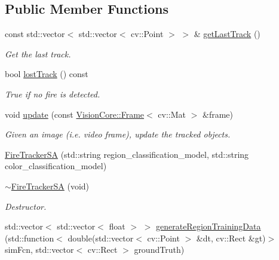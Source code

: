 \subsection*{Public Member Functions}
\begin{DoxyCompactItemize}
\item 
const std\+::vector$<$ std\+::vector$<$ cv\+::\+Point $>$ $>$ \& \hyperlink{class_fire_tracker_s_a_ae1ccd303e827f5d00620e54bb11a968c}{get\+Last\+Track} ()
\begin{DoxyCompactList}\small\item\em Get the last track. \end{DoxyCompactList}\item 
bool \hyperlink{class_fire_tracker_s_a_ac7e0977fa702f98038bbe303df458a6c}{lost\+Track} () const 
\begin{DoxyCompactList}\small\item\em True if no fire is detected. \end{DoxyCompactList}\item 
void \hyperlink{class_fire_tracker_s_a_ab233da15b6c7aad7d83c67057a558bd4}{update} (const \hyperlink{struct_vision_core_1_1_data_structures_1_1_frame}{Vision\+Core\+::\+Frame}$<$ cv\+::\+Mat $>$ \&frame)
\begin{DoxyCompactList}\small\item\em Given an image (i.\+e. video frame), update the tracked objects. \end{DoxyCompactList}\item 
\hyperlink{class_fire_tracker_s_a_a84a670238d047b32a9c891e663af11a4}{Fire\+Tracker\+S\+A} (std\+::string region\+\_\+classification\+\_\+model, std\+::string color\+\_\+classification\+\_\+model)
\item 
\hypertarget{class_fire_tracker_s_a_abb85070ecc5c08135c32b7de365f8cb4}{}\hyperlink{class_fire_tracker_s_a_abb85070ecc5c08135c32b7de365f8cb4}{$\sim$\+Fire\+Tracker\+S\+A} (void)\label{class_fire_tracker_s_a_abb85070ecc5c08135c32b7de365f8cb4}

\begin{DoxyCompactList}\small\item\em Destructor. \end{DoxyCompactList}\item 
std\+::vector$<$ std\+::vector$<$ float $>$ $>$ \hyperlink{class_fire_tracker_s_a_a68d4ec4232aa3139b0ffa3196f2aa58a}{generate\+Region\+Training\+Data} (std\+::function$<$ double(std\+::vector$<$ cv\+::\+Point $>$ \&dt, cv\+::\+Rect \&gt)$>$ sim\+Fcn, std\+::vector$<$ cv\+::\+Rect $>$ ground\+Truth)
\end{DoxyCompactItemize}
